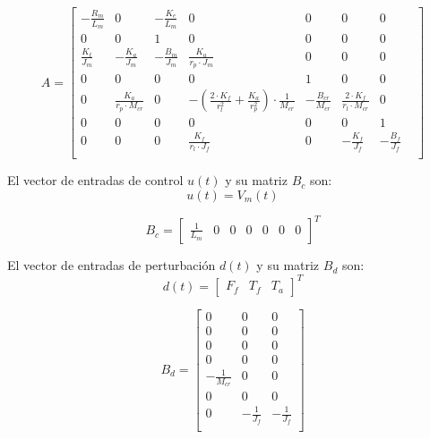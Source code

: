 \documentclass{article}
\begin{document}
\begin{equation}
A =
\begin{bmatrix}
-\frac{R_m}{L_m} & 0 & -\frac{K_e}{L_m} & 0 & 0 & 0 & 0 \\
0 & 0 & 1 & 0 & 0 & 0 & 0 & \\
\frac{K_t}{J_m} & -\frac{K_a}{J_m} & -\frac{B_m}{J_m} & \frac{K_a}{r_p\cdot J_m} & 0 & 0 & 0 \\
0 & 0 & 0 & 0 & 1 & 0 & 0 \\
0 & \frac{K_a}{r_p \cdot M_{cr}} & 0 & -\left(\frac{2\cdot K_f}{r_l^2} + \frac{K_a}{r_p^2} \right)\cdot \frac{1}{M_{cr}} & -\frac{B_{cr}}{M_{cr}} & \frac{2\cdot K_f}{r_l \cdot M_{cr}} & 0 \\
0 & 0 & 0 & 0 & 0 & 0 & 1 \\
0 & 0 & 0 & \frac{K_f}{r_l\cdot J_f} & 0 & -\frac{K_f}{J_f} & -\frac{B_f}{J_f} \\
\end{bmatrix}
\end{equation}

El vector de entradas de control $u(t)$ y su matriz $B_c$ son:
\begin{equation}
u(t) = V_m(t)
\end{equation}

\begin{equation}
B_c =
\begin{bmatrix}
\frac{1}{L_m} &
0 &
0 &
0 &
0 &
0 &
0
\end{bmatrix}^T
\end{equation}

El vector de entradas de perturbación $d(t)$ y su matriz $B_d$ son:
\begin{equation*}
d(t) =
\begin{bmatrix}
F_f & T_f & T_a
\end{bmatrix}^T
\end{equation*}

\begin{equation}
B_d =
\begin{bmatrix}
0 & 0 & 0 \\
0 & 0 & 0 \\
0 & 0 & 0 \\
0 & 0 & 0 \\
-\frac{1}{M_{cr}} & 0 & 0 \\
0 & 0 & 0 \\
0 & -\frac{1}{J_f} & -\frac{1}{J_f} \\
\end{bmatrix}
\end{equation}
\end{document}
